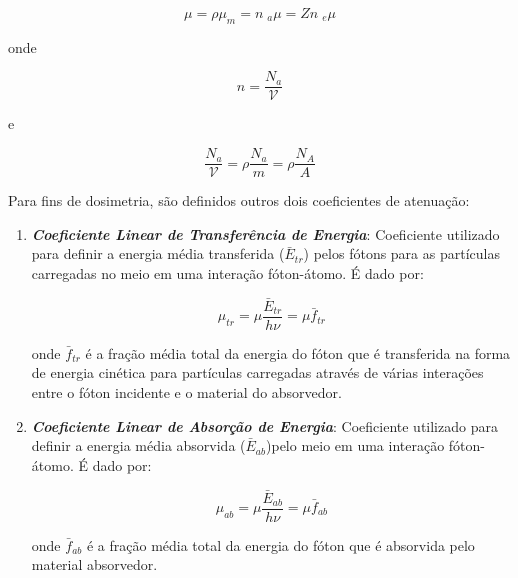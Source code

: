\documentclass[11pt,a4paper]{article}
\begin{document}
            \begin{equation}
                \mu = \rho \mu_m = n\;{}_a\mu = Zn\;{}_e\mu
            \end{equation}

    \noindent onde 

                \begin{equation}
                    n = \frac{N_a}{\mathcal{V}}
                \end{equation}

    \noindent e

                \begin{equation}
                    \frac{N_a}{\mathcal{V}} = \rho \frac{N_a}{m} = \rho \frac{N_A}{A}
                \end{equation}

    Para fins de dosimetria, são definidos outros dois coeficientes de atenuação:

    \begin{enumerate}
		\item \textbf{\textit{\textcolor{CarnationPink}{Coeficiente Linear de Transferência de Energia}}}: Coeficiente utilizado para definir a energia média transferida ($\bar{E}_{tr}$) pelos fótons para as partículas carregadas no meio em uma interação fóton-átomo. É dado por:
		
			\begin{equation}
				\mu_{tr} = \mu \frac{\bar{E}_{tr}}{h \nu} = \mu \bar{f}_{tr}
			\end{equation}

		\noindent onde $\bar{f}_{tr}$ é a fração média total da energia do fóton que é transferida na forma de energia cinética para partículas carregadas através de várias interações entre o fóton incidente e o material do absorvedor.
		
		\item \textbf{\textit{\textcolor{CarnationPink}{Coeficiente Linear de Absorção de Energia}}}: Coeficiente utilizado para definir a energia média absorvida ($\bar{E}_{ab}$)pelo meio em uma interação fóton-átomo. É dado por:
			
			\begin{equation}
				\mu_{ab} = \mu \frac{\bar{E}_{ab}}{h \nu} = \mu \bar{f}_{ab}
			\end{equation}

		\noindent onde $\bar{f}_{ab}$ é a fração média total da energia do fóton que é absorvida pelo material absorvedor.
	\end{enumerate}
\end{document}

